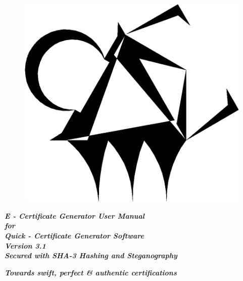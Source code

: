 

\begin{titlingpage}
\thispagestyle{empty}\centering

\begin{figure}[H]
	\centering
	\includegraphics[width=0.7\linewidth]{"images/logo_no_bg copy"}
\end{figure}

\vspace{0.4cm}
\vspace{1.2cm}

\Large \textit{\textbf{E - Certificate Generator User Manual}}\\
\Large \textit{\textbf{for}}\\
\Large \textit{\textbf{Quick - Certificate Generator Software}}\\
\vspace{0.8cm}
\Large \textit{\textbf{Version 3.1}}\\
\Large \textit{\textbf{Secured with SHA-3 Hashing and Steganography}}

\vspace{2.1cm}
\normalsize\textit{\textbf{Towards swift, perfect \& authentic certifications}}




\end{titlingpage}
